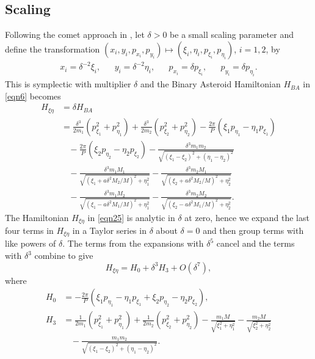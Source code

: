 \documentclass[12pt]{article}
\begin{document}
\subsection{Scaling}
Following the comet approach in \cite{meyerOffin}, let $\delta > 0$ be a small scaling parameter and define the transformation $(x_i,y_i,p_{x_i},p_{y_i}) \mapsto (\xi_i,\eta_i,p_{\xi_i},p_{\eta_i})$, $i=1,2$, by
\begin{align}
x_i = \delta^{-2}\xi_i, & & y_i = \delta^{-2}\eta_i, & & p_{x_i} = \delta p_{\xi_i}, & & p_{y_i} = \delta p_{\eta_i}.
\label{eqn22}
\end{align}
This is symplectic with multiplier $\delta$ and the Binary Asteroid Hamiltonian $H_{BA}$ in \eqref{eqn6} becomes
\begin{align}
H_{\xi\eta} 
& = \delta H_{BA} \\
& = \frac{\delta^3}{2m_1}\left(p_{\xi_1}^2 + p_{\eta_1}^2\right) + \frac{\delta^3}{2m_2}\left(p_{\xi_2}^2 + p_{\eta_2}^2\right) - \frac{2\pi}{P}\left(\xi_1p_{\eta_1} - \eta_1p_{\xi_1}\right) \nonumber\\
& \ \ \ \ - \frac{2\pi}{P}\left(\xi_2p_{\eta_2} - \eta_2p_{\xi_2}\right) - \frac{\delta^3m_1m_2}{\sqrt{(\xi_1 - \xi_2)^2 + (\eta_1 - \eta_2)^2}} \nonumber\\
& \ \ \ \ -\frac{\delta^3m_1M_1}{\sqrt{(\xi_1 + a\delta^2M_2/M)^2 + \eta_1^2}} -\frac{\delta^3m_2M_1}{\sqrt{(\xi_2 + a\delta^2M_2/M)^2 + \eta_2^2}} \nonumber\\
& \ \ \ \ -\frac{\delta^3m_1M_2}{\sqrt{(\xi_1 - a\delta^2M_1/M)^2 + \eta_1^2}} -\frac{\delta^3m_2M_2}{\sqrt{(\xi_2 - a\delta^2M_1/M)^2 + \eta_2^2}}.
\label{eqn25}
\end{align}
The Hamiltonian $H_{\xi\eta}$ in \eqref{eqn25} is analytic in $\delta$ at zero, hence we expand the last four terms in $H_{\xi\eta}$ in a Taylor series in $\delta$ about $\delta=0$ and then group terms with like powers of $\delta$. The terms from the expansions with $\delta^5$ cancel and the terms with $\delta^3$ combine to give 
\begin{equation}
H_{\xi\eta} = H_0 + \delta^3H_3 + O(\delta^7),
\label{eqn26}
\end{equation}
where
\begin{align}
H_0 & = -\frac{2\pi}{P}\left(\xi_1p_{\eta_1} - \eta_1p_{\xi_1} + \xi_2p_{\eta_2} - \eta_2p_{\xi_2}\right),\nonumber\\
H_3 & = \frac{1}{2m_1}\left(p_{\xi_1}^2 + p_{\eta_1}^2\right) + \frac{1}{2m_2}\left(p_{\xi_2}^2 + p_{\eta_2}^2\right) - \frac{m_1M}{\sqrt{\xi_1^2 + \eta_1^2}} - \frac{m_2M}{\sqrt{\xi_2^2 + \eta_2^2}} \nonumber\\
& \ \ \ \ - \frac{m_1m_2}{\sqrt{(\xi_1 - \xi_2)^2 + (\eta_1 - \eta_2)^2}}.
\label{eqn27}
\end{align}
\end{document}
